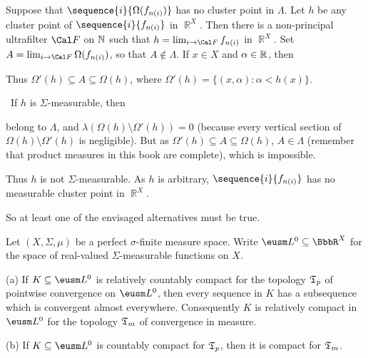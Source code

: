 {\medskip

 Suppose that $\sequence{i}{\Omega(f_{n(i)})}$ has no
cluster point in $\Lambda$.   Let $h$ be any cluster point of
$\sequence{i}{f_{n(i)}}$ in $\BbbR^X$.   Then there is a non-principal
ultrafilter $\Cal F$ on $\Bbb N$ such that $h=\lim_{i\to\Cal F}f_{n(i)}$
in $\BbbR^X$.   Set $A=\lim_{i\to\Cal F}\Omega(f_{n(i)})$, so that
$A\notin\Lambda$.   If $x\in X$ and $\alpha\in\Bbb R$, then



\noindent Thus $\Omega'(h)\subseteq A\subseteq\Omega(h)$, where
$\Omega'(h)=\{(x,\alpha):\alpha<h(x)\}$.

\Quer\ If $h$ is $\Sigma$-measurable, then



\noindent belong to $\Lambda$, and
$\lambda(\Omega(h)\setminus\Omega'(h))=0$ (because every vertical
section of $\Omega(h)\setminus\Omega'(h)$ is negligible).   But as
$\Omega'(h)\subseteq A\subseteq\Omega(h)$, $A\in\Lambda$ (remember that
product measures in this book are complete), which is
impossible.\ \Bang

Thus $h$ is not $\Sigma$-measurable.   As $h$ is arbitrary,
$\sequence{i}{f_{n(i)}}$ has no measurable cluster point in $\BbbR^X$.

So at least one of the envisaged alternatives must be true.
}%

 Let $(X,\Sigma,\mu)$ be a perfect
$\sigma$-finite measure space.   Write $\eusm L^0\subseteq\BbbR^X$ for
the space of real-valued $\Sigma$-measurable functions on $X$.

(a) If $K\subseteq\eusm L^0$ is relatively countably compact for the
topology $\frak T_p$ of pointwise convergence on $\eusm L^0$, then every
sequence in
$K$ has a subsequence which is convergent almost everywhere.
Consequently $K$ is relatively compact in $\eusm L^0$ for the topology
$\frak T_m$ of convergence in measure.

(b) If $K\subseteq\eusm L^0$ is countably compact for $\frak T_p$, then
it is compact for $\frak T_m$.

